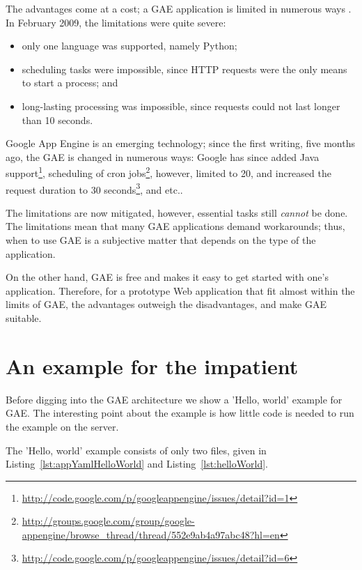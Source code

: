 The advantages come at a cost; a GAE application is limited in numerous ways
\citep{Google:quota, Google:cgi}. In February 2009, the limitations were quite
severe:
\begin{itemize}
  \item only one language was supported, namely Python;
  \item scheduling tasks were impossible, since HTTP requests were the only means
  to start a process; and
  \item long-lasting processing was impossible, since requests could not last longer
  than 10 seconds.
\end{itemize}
Google App Engine is an emerging technology; since the first writing, five months
ago, the GAE is changed in numerous
ways: Google has since added Java support\footnote{\url{http://code.google.com/p/googleappengine/issues/detail?id=1}
}, scheduling of cron jobs\footnote{\url{http://groups.google.com/group/google-appengine/browse_thread/thread/552e9ab4a97abc48?hl=en}
}, however, limited to 20, and increased
the request duration to 30 seconds\footnote{\url{http://code.google.com/p/googleappengine/issues/detail?id=6}
}, and etc..

The limitations are now mitigated, however, essential tasks still \textit{cannot}
be done. The limitations mean that many GAE applications demand workarounds;
thus, when to use GAE is a subjective matter that depends on the type of the
application.

On the other hand, GAE is free and makes it easy to get started with one's
application. Therefore, for a prototype Web application that fit almost within
the limits of GAE, the advantages outweigh the disadvantages, and make GAE
suitable.



\section{An example for the impatient}
Before digging into the GAE architecture we show a 'Hello, world' example for
GAE. The interesting point about the example is how little code is needed to run
the example on the server.

The 'Hello, world' example consists of only two files, given in
Listing~\ref{lst:appYamlHelloWorld} and Listing~\ref{lst:helloWorld}.

